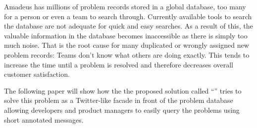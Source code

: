 Amadeus has millions of problem records stored in a global database, too many for a person or even a team to search through. Currently available tools to search the database are not adequate for quick and easy searches. As a result of this, the valuable information in the database becomes inaccessible as there is simply too much noise. That is the root cause for many duplicated or wrongly assigned new problem records: Teams don't know what others are doing exactly. This tends to increase the time until a problem is resolved and therefore decreases overall customer satisfaction.

The following paper will show how the the proposed solution called ``{\reporttitle}'' tries to solve this problem as a Twitter-like facade in front of the problem database allowing developers and product managers to easily query the problems using short annotated messages.
